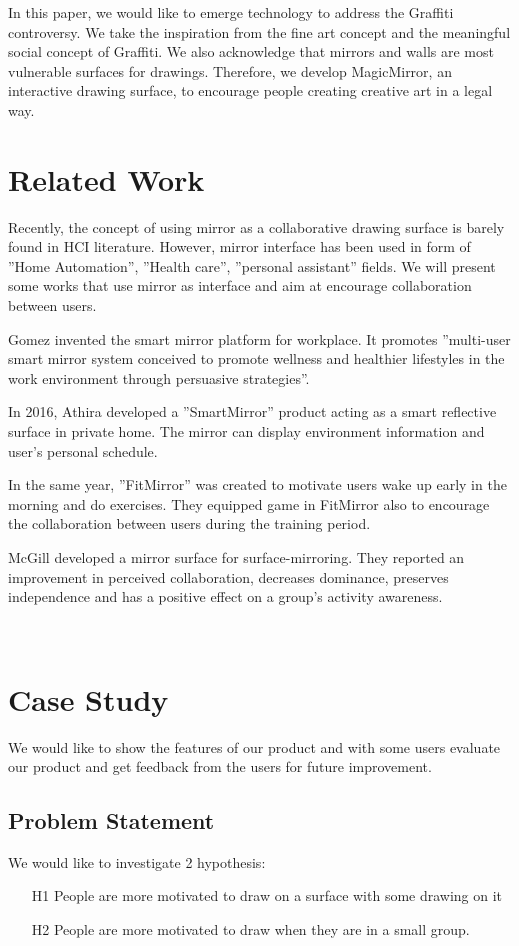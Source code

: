 \documentclass{sigchi-ext}
\begin{document}
In this paper, we would like to emerge technology to address the Graffiti controversy. We take the inspiration from the fine art concept and the meaningful social concept of Graffiti. We also acknowledge that mirrors and walls are most vulnerable surfaces for drawings.  Therefore, we develop MagicMirror, an interactive drawing surface, to encourage people creating creative art in a legal way.

\section{Related Work}
Recently, the concept of using mirror as a collaborative drawing surface is barely found in HCI literature. However, mirror interface has been used in form of ''Home Automation'', ''Health care'', ''personal assistant'' fields. We will present some works that use mirror as interface and aim at encourage collaboration between users.

Gomez \cite{gomez-carmonaSmiWorkInteractiveSmart2017} invented the smart mirror platform for workplace. It promotes ''multi-user smart mirror system conceived to promote wellness and healthier lifestyles in the work environment through persuasive strategies''.

In 2016, Athira \cite{athiraSmartMirrorNovel2016} developed a ''SmartMirror'' product acting as a smart reflective surface in private home. The mirror can display environment information and user's personal schedule.

In the same year, ''FitMirror'' \cite{bessererFitmirrorSmartMirror2016} was created  to motivate users wake up early in the morning and do exercises. They equipped game in FitMirror also to encourage the collaboration between users during the training period.

McGill \cite{mcgillMirrorMirrorWall2014} developed a mirror surface for surface-mirroring. They reported an improvement in perceived collaboration, decreases dominance, preserves independence and has a positive effect on a group's activity awareness.



\
\section{Case Study}
We would like to show the features of our product and with some users evaluate our product and get feedback from the users for future improvement.
\subsection{Problem Statement}
We would like to investigate 2 hypothesis:
\begin{itemize}
	\item[H1] People are more motivated to draw on a surface with some drawing on it
	\item[H2] People are more motivated to draw when they are in a small group.
\end{itemize}
\end{document}

